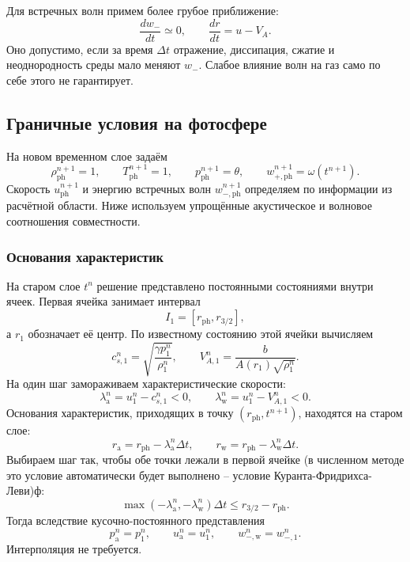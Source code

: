 \documentclass[11pt,a4paper]{article}
\newcommand{\VA}{V_A}
\begin{document}
Для встречных волн примем более грубое приближение:
\begin{equation}
 \boxed{
 \frac{dw_-}{dt}\simeq0,
 \qquad
 \frac{dr}{dt}=u-\VA.
 }
 \label{bc:wave-path}
\end{equation}
Оно допустимо, если за время $\Delta t$ отражение,
диссипация, сжатие и неоднородность среды
мало меняют $w_-$.
Слабое влияние волн на газ само по себе
этого не гарантирует.

\subsection{Граничные условия на фотосфере}

На новом временном слое задаём
\[
\rho_{\mathrm{ph}}^{n+1}=1,\qquad
T_{\mathrm{ph}}^{n+1}=1,\qquad
p_{\mathrm{ph}}^{n+1}=\theta,\qquad
w_{+,\mathrm{ph}}^{n+1}=\omega(t^{n+1}).
\]
Скорость $u_{\mathrm{ph}}^{n+1}$ и энергию встречных волн
$w_{-,\mathrm{ph}}^{n+1}$ определяем по информации
из расчётной области.
Ниже используем упрощённые акустическое и волновое
соотношения совместности.

\subsubsection{Основания характеристик}

На старом слое $t^n$ решение представлено постоянными
состояниями внутри ячеек.
Первая ячейка занимает интервал
\[
I_1=[r_{\mathrm{ph}},r_{3/2}],
\]
а $r_1$ обозначает её центр.
По известному состоянию этой ячейки вычисляем
\[
c_{s,1}^n=\sqrt{\frac{\gamma p_1^n}{\rho_1^n}},
\qquad
V_{A,1}^n=\frac{b}{A(r_1)\sqrt{\rho_1^n}}.
\]
На один шаг замораживаем характеристические скорости:
\[
\lambda_{\mathrm a}^n=u_1^n-c_{s,1}^n<0,
\qquad
\lambda_{\mathrm w}^n=u_1^n-V_{A,1}^n<0.
\]
Основания характеристик, приходящих в точку
$(r_{\mathrm{ph}},t^{n+1})$, находятся на старом слое:
\[
r_{\mathrm a}=r_{\mathrm{ph}}-\lambda_{\mathrm a}^n\Delta t,
\qquad
r_{\mathrm w}=r_{\mathrm{ph}}-\lambda_{\mathrm w}^n\Delta t.
\]
Выбираем шаг так, чтобы обе точки лежали в первой ячейке (в численном методе это условие автоматически будет выполнено -- условие Куранта-Фридрихса-Леви)ф:
\[
\max(-\lambda_{\mathrm a}^n,-\lambda_{\mathrm w}^n)\Delta t
\le r_{3/2}-r_{\mathrm{ph}}.
\]
Тогда вследствие кусочно-постоянного представления
\[
p_{\mathrm a}^n=p_1^n,\qquad
u_{\mathrm a}^n=u_1^n,\qquad
w_{-,\mathrm w}^n=w_{-,1}^n.
\]
Интерполяция не требуется.

\end{document}
